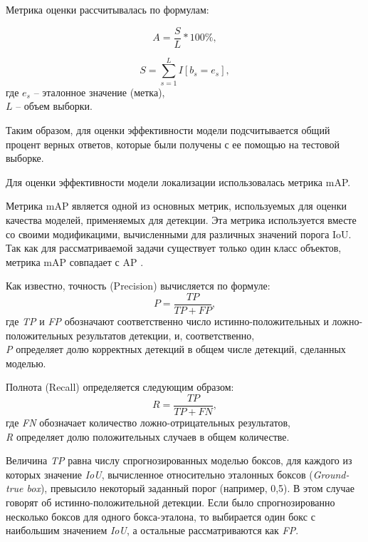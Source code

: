 Метрика оценки рассчитывалась по формулам:

\begin{equation*}
    A = \frac{S}{L} * 100\%,
\end{equation*}

\begin{equation*}
    S = \sum_{s=1}^L I[b_s = e_s],
\end{equation*}
где $e_s$ -- эталонное значение (метка),\\
$L$ -- объем выборки. 

Таким образом, для оценки эффективности модели подсчитывается общий процент верных ответов, которые были получены с ее помощью на тестовой выборке.

Для оценки эффективности модели локализации использовалась метрика mAP.

Метрика mAP является одной из основных метрик, используемых для оценки качества моделей, применяемых для детекции. Эта метрика используется вместе со своими модификацими, вычисленными для различных значений порога IoU. Так как для рассматриваемой задачи существует только один класс объектов, метрика mAP совпадает с AP \cite[c.~11]{Everingham2010}.

Как известно, точность (Precision) вычисляется по формуле:
\begin{equation}
	\label{eq:precision}
    P = \frac{TP}{TP + FP},
\end{equation}
где \textit{TP} и \textit{FP} обозначают соответственно число истинно-положительных и ложно-положительных результатов детекции, и, соответственно,\\
\textit{P} определяет долю корректных детекций в общем числе детекций, сделанных моделью.

Полнота (Recall) определяется следующим образом:
\begin{equation}
	\label{eq:recall}
    R = \frac{TP}{TP + FN},
\end{equation}
где \textit{FN} обозначает количество ложно-отрицательных результатов,\\
\textit{R} определяет долю положительных случаев в общем количестве. 

Величина \textit{TP} равна числу спрогнозированных моделью боксов, для каждого из которых значение \textit{IoU}, вычисленное относительно эталонных боксов (\textit{Ground-true box}), превысило некоторый заданный порог (например, 0,5). В этом случае говорят об истинно-положительной детекции. Если было спрогнозированно несколько боксов для одного бокса-эталона, то выбирается один бокс с наибольшим значением \textit{IoU}, а остальные рассматриваются как \textit{FP}.

